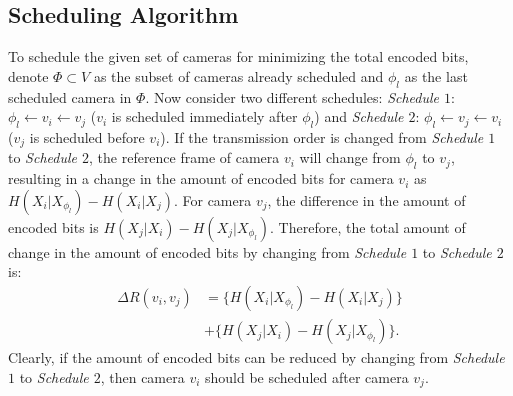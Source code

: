 \subsection{Scheduling Algorithm}
\label{sec::SchedulingAlgorithm}


To schedule the given set of cameras for minimizing the total encoded bits,
denote $\Phi \subset V$ as the subset of cameras already scheduled and
$\phi_l$ as the last scheduled camera in $\Phi$.
Now consider two different schedules:
\emph{Schedule $1$}: ${\phi_l \leftarrow v_i \leftarrow v_j}$ ($v_i$ is scheduled
immediately after $\phi_l$) and
\emph{Schedule $2$}: ${\phi_l \leftarrow v_j \leftarrow v_i}$ ($v_j$ is scheduled
before $v_i$).
If the transmission order is changed from \emph{Schedule $1$} to \emph{Schedule
$2$}, the reference frame of camera $v_i$ will change from $\phi_l$ to $v_j$,
resulting in a change in the amount of encoded bits for camera $v_i$
as ${H(X_i|X_{\phi_l}) - H(X_i|X_j)}$.
For camera $v_j$, the difference in the amount of encoded bits is
${H(X_j|X_i)-H(X_j|X_{\phi_l})}$.
%
Therefore, the total amount of change in the amount of encoded bits by changing
from {\em Schedule $1$} to {\em Schedule $2$} is:
\begin{align}
\Delta R(v_i,v_j) &=  \{ H(X_i|X_{\phi_l})-H(X_i|X_j) \} \nonumber \\
			      &+  \{ H(X_j|X_i)-H(X_j|X_{\phi_l}) \}.
\label{eq::resourceDifference}
\end{align}
%
Clearly,
if the amount of encoded bits can be reduced by changing
from \emph{Schedule $1$} to \emph{Schedule $2$}, then camera $v_i$ should
be scheduled after camera $v_j$.

